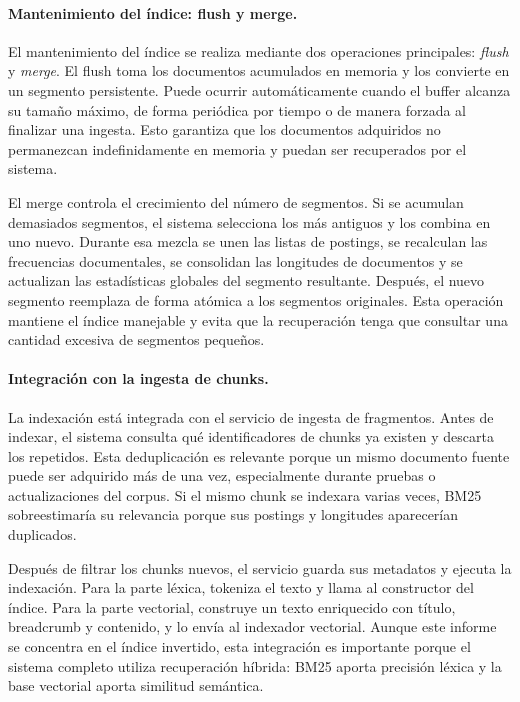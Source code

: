 \documentclass[11pt]{article}
\begin{document}
\paragraph{Mantenimiento del índice: flush y merge.}
El mantenimiento del índice se realiza mediante dos operaciones principales: \emph{flush} y
\emph{merge}. El flush toma los documentos acumulados en memoria y los convierte en un segmento
persistente. Puede ocurrir automáticamente cuando el buffer alcanza su tamaño máximo, de forma
periódica por tiempo o de manera forzada al finalizar una ingesta. Esto garantiza que los
documentos adquiridos no permanezcan indefinidamente en memoria y puedan ser recuperados por el
sistema.

El merge controla el crecimiento del número de segmentos. Si se acumulan demasiados segmentos,
el sistema selecciona los más antiguos y los combina en uno nuevo. Durante esa mezcla se unen las
listas de postings, se recalculan las frecuencias documentales, se consolidan las longitudes de
documentos y se actualizan las estadísticas globales del segmento resultante. Después, el nuevo
segmento reemplaza de forma atómica a los segmentos originales. Esta operación mantiene el índice
manejable y evita que la recuperación tenga que consultar una cantidad excesiva de segmentos
pequeños.

\paragraph{Integración con la ingesta de chunks.}
La indexación está integrada con el servicio de ingesta de fragmentos. Antes de indexar, el
sistema consulta qué identificadores de chunks ya existen y descarta los repetidos. Esta
deduplicación es relevante porque un mismo documento fuente puede ser adquirido más de una vez,
especialmente durante pruebas o actualizaciones del corpus. Si el mismo chunk se indexara varias
veces, BM25 sobreestimaría su relevancia porque sus postings y longitudes aparecerían duplicados.

Después de filtrar los chunks nuevos, el servicio guarda sus metadatos y ejecuta la indexación.
Para la parte léxica, tokeniza el texto y llama al constructor del índice. Para la parte vectorial,
construye un texto enriquecido con título, breadcrumb y contenido, y lo envía al indexador
vectorial. Aunque este informe se concentra en el índice invertido, esta integración es
importante porque el sistema completo utiliza recuperación híbrida: BM25 aporta precisión léxica
y la base vectorial aporta similitud semántica.
\end{document}
